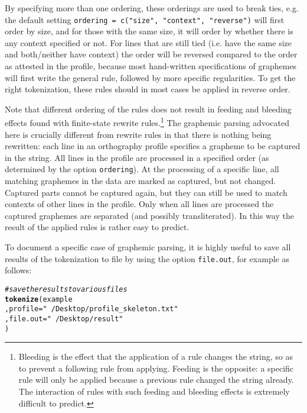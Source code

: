 \documentclass[output=inprep,
		biblatex
		]{LSP/langsci}\usepackage[]{graphicx}\usepackage[]{color}
\makeatletter
\newcommand{\hlstr}[1]{\textcolor[rgb]{0.192,0.494,0.8}{#1}}%
\newcommand{\hlcom}[1]{\textcolor[rgb]{0.678,0.584,0.686}{\textit{#1}}}%
\newcommand{\hlstd}[1]{\textcolor[rgb]{0.345,0.345,0.345}{#1}}%
\newcommand{\hlkwc}[1]{\textcolor[rgb]{0.333,0.667,0.333}{#1}}%
\newcommand{\hlkwd}[1]{\textcolor[rgb]{0.737,0.353,0.396}{\textbf{#1}}}%
\newenvironment{kframe}{%
 \def\at@end@of@kframe{}%
 \ifinner\ifhmode%
  \def\at@end@of@kframe{\end{minipage}}%
  \begin{minipage}{\columnwidth}%
 \fi\fi%
 \def\FrameCommand##1{\hskip\@totalleftmargin \hskip-\fboxsep
 \colorbox{shadecolor}{##1}\hskip-\fboxsep
     \hskip-\linewidth \hskip-\@totalleftmargin \hskip\columnwidth}%
 \MakeFramed {\advance\hsize-\width
   \@totalleftmargin\z@ \linewidth\hsize
   \@setminipage}}%
 {\par\unskip\endMakeFramed%
 \at@end@of@kframe}
\newenvironment{knitrout}{}{} %
\makeatother
\begin{document}
By specifying more than one ordering, these orderings are used to break ties,
e.g. the default setting \texttt{ordering = c("size", "context", "reverse")}
will first order by size, and for those with the same size, it will order by
whether there is any context specified or not. For lines that are still tied
(i.e. have the same size and both/neither have context) the order will be
reversed compared to the order as attested in the profile, because most
hand-written specifications of graphemes will first write the general rule,
followed by more specific regularities. To get the right tokenization, these 
rules should in most cases be applied in reverse order.

Note that different ordering of the rules does not result in 
feeding and bleeding effects found with finite-state rewrite
rules.\footnote{Bleeding is the effect that the application of a rule changes
the string, so as to prevent a following rule from applying. Feeding is the opposite: a
specific rule will only be applied because a previous rule changed the string
already. The interaction of rules with such feeding and bleeding effects is
extremely difficult to predict.} The graphemic parsing advocated here is 
crucially different from rewrite rules in that there is nothing being rewritten:
each line in an orthography profile specifies a grapheme to be captured in the 
string. All lines in the profile are processed in a specified order (as determined
by the option \texttt{ordering}). At the processing of a specific line, all 
matching graphemes in the data are marked as captured, but not changed. 
Captured parts cannot be captured again, but they can still be used to match 
contexts of other lines in the profile. Only when all lines are processed the 
captured graphemes are separated (and possibly transliterated). In this way the 
result of the applied rules is rather easy to predict.

To document a specific case of graphemic parsing, it is highly useful to save
all results of the tokenization to file by using the option \texttt{file.out},
for example as follows: 

\begin{knitrout}\footnotesize
{}\color{fgcolor}\begin{kframe}
\begin{alltt}
\hlcom{# save the results to various files}
\hlkwd{tokenize}\hlstd{( example}
         \hlstd{,} \hlkwc{profile} \hlstd{=} \hlstr{"~/Desktop/profile_skeleton.txt"}
         \hlstd{,} \hlkwc{file.out} \hlstd{=} \hlstr{"~/Desktop/result"}
        \hlstd{)}
\end{alltt}
\end{kframe}
\end{knitrout}
\end{document}
